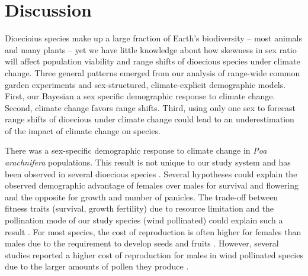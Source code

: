 \documentclass[12pt]{article}
\newcommand{\tom}[2]{{\color{red}{#1}}\footnote{\textit{\color{red}{#2}}}}
\begin{document}
\section*{Discussion}
Dioecioius species make up a large fraction of Earth's biodiversity -- most animals and many plants -- yet we have little knowledge about how skewness in sex ratio will affect population viability and range shifts of dioecious species under climate change.
Three general patterns emerged from our analysis of range-wide common garden experiments and sex-structured, climate-explicit demographic models.
First, our Bayesian a sex specific demographic response to climate change.
Second, climate change favors range shifts. 
Third, using only one sex to forecast range shifts of dioecious under climate change could lead to an underestimation of the impact of  climate change on species.


There was a sex-specific demographic response to climate change in \emph{Poa arachnifera} populations.
This result is not unique to our study system and has been observed in several dioecious species \citep{welbergen2008climate,zhao2012sex,sasaki2019complex}. 
Several hypotheses could explain the observed demographic advantage of females over males for survival and flowering and the opposite for growth and number of panicles.
The trade-off between fitness traits (survival, growth fertility) due to resource limitation and the pollination mode of our study species (wind pollinated) could explain such a result \citep{cipollini1994sexual,freeman1976differential}.
For most species, the cost of reproduction is often higher for females than males due to the requirement to develop seeds and fruits \citep{hultine2016climate}. 
However, several studies reported a higher cost of reproduction for males in wind pollinated species due to the larger amounts of pollen they produce \citep{burli2022environmental,cipollini1994sexual,bruijning2017surviving,field2013comparative}.


\end{document}
